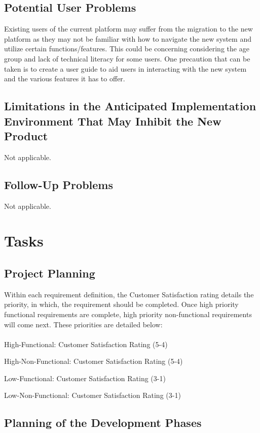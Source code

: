 \documentclass[12pt]{article}
\begin{document}
\subsection{Potential User Problems}

Existing users of the current platform may suffer from the migration
to the new platform as they may not be familiar with how to navigate
the new system and utilize certain functions/features. This could be
concerning considering the age group and lack of technical literacy
for some users. One precaution that can be taken is to create a user
guide to aid users in interacting with the new system and the various
features it has to offer.

\subsection{Limitations in the Anticipated Implementation Environment That May
Inhibit the New Product}
Not applicable.
\subsection{Follow-Up Problems}
Not applicable.

\section{Tasks}
\subsection{Project Planning}

Within each requirement definition, the Customer Satisfaction rating details the
priority, in which, the requirement should be completed. Once high priority
functional requirements are complete, high priority non-functional requirements
will come next. These priorities are detailed below: \\\\

High-Functional: Customer Satisfaction Rating (5-4)

High-Non-Functional: Customer Satisfaction Rating (5-4)

Low-Functional: Customer Satisfaction Rating (3-1)

Low-Non-Functional: Customer Satisfaction Rating (3-1)

\subsection{Planning of the Development Phases}
\end{document}
